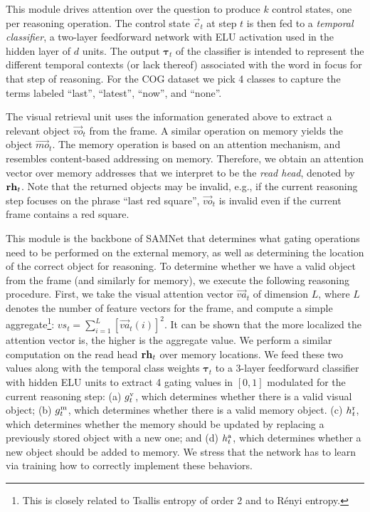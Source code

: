 This module drives attention over the question to produce $k$ control states, one per reasoning operation.
The control state $\vec{c}_t$ at step $t$ is then fed to a \emph{temporal classifier}, 
a two-layer feedforward network with ELU activation used in the hidden layer of $d$ units.
The output $\bm{\tau}_t$ of the classifier is intended to represent the different temporal contexts (or lack thereof) associated with the word in focus for that step of reasoning.	
For the COG dataset we pick 4 classes to capture the terms labeled ``last'', ``latest'', ``now'', and ``none''.

The visual retrieval unit uses the information generated above to extract a relevant object $\vec{vo}_t$ from the frame.
A similar operation on memory yields the object $\vec{mo}_t$. The memory operation is based on an attention mechanism, and resembles content-based addressing on memory. Therefore, we obtain an attention vector over memory addresses that we interpret to be the \emph{read head}, denoted by $\mathbf{rh}_t$.
Note that the returned objects may be invalid, e.g., if the current reasoning step focuses on the phrase ``last red square'', $\vec{vo}_t$ is invalid even if the current frame contains a red square. 

This module is the backbone of SAMNet that determines what gating operations need to be performed on the external memory, as well as determining the location of the correct object for reasoning.
To determine whether we have a valid object from the frame (and similarly for memory), we execute the following reasoning procedure.
First, we take the visual attention vector $\vec{va}_t$ of dimension $L$, where $L$ denotes the number of feature vectors for the frame,
and compute a simple aggregate\footnote{%
	This is closely related to Tsallis entropy of order 2 and to R\'{e}nyi entropy.}: %
$vs_t = \sum_{i=1}^L [\vec{va}_t(i)]^2$. It can be shown that the more localized the attention
vector is, the higher is the aggregate value.
We perform a similar computation on the read head $\mathbf{rh}_t$ over memory locations.
We feed these two values along with the temporal class weights $\bm{\tau}_t$ to a 3-layer feedforward classifier with hidden ELU units to extract 4 gating values
in $[0,1]$ modulated for the current reasoning step:
(a) $g^{\mathrm{v}}_t$, which determines whether there is a valid visual object;
(b) $g^{\mathrm{m}}_t$, which determines whether there is a valid memory object. 
(c) $h^{\mathrm{r}}_t$, which determines whether the memory should be updated by replacing a previously stored object with a new one; and
(d) $h^{\mathrm{a}}_t$, which determines whether a new object should be added to memory.
We stress that the network has to learn via training how to correctly implement these behaviors.


